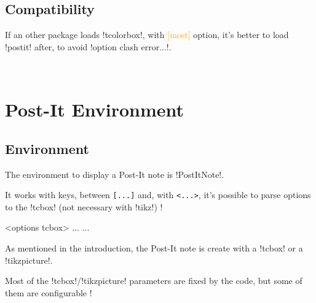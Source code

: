 \documentclass[english,a4paper,11pt]{article}
\newcommand\Cle[1]{{\small\sffamily\textlangle \textcolor{orange}{#1}\textrangle}}
\begin{document}
\subsection{Compatibility}

\begin{cautionblock}
If an other package loads \packagetex!tcolorbox!, with \Cle{[most]} option, it's better to load \packagetex!postit! after, to avoid \motcletex!option clash error...!.
\end{cautionblock}


\vfill~

\pagebreak

\section{Post-It Environment}

\subsection{Environment}

\begin{cautionblock}
The environment to display a Post-It note is \packagetex!PostItNote!.

It works with keys, between \texttt{[...]} and, with \texttt{<...>}, it's possible to parse options to  the \motcletex!tcbox! (not necessary with \motcletex!tikz!) !
\end{cautionblock}

\begin{DemoCode}
\begin{PostIt}[keys]<options tcbox>
...
...
\end{PostIt}
\end{DemoCode}

\begin{noteblock}
As mentioned in the introduction, the Post-It note is create with a \motcletex!tcbox! or a  \motcletex!tikzpicture!.

Most of the \motcletex!tcbox!/\motcletex!tikzpicture! parameters are fixed by the code, but some of them are configurable !
\end{noteblock}

\begin{DemoCode}[]
\begin{PostItNote}
\lipsum[1][1-2]
\end{PostItNote}
\end{DemoCode}
\end{document}
